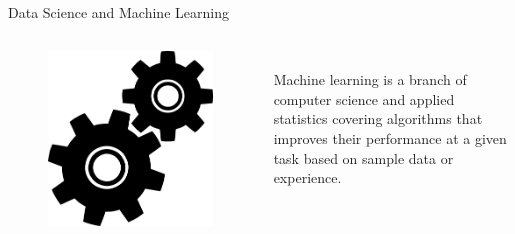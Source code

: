 








\begin{frame}{Data Science and Machine Learning}

\begin{columns}
    \begin{figure}
      \includegraphics[width=\textwidth]{plots/gears.png}
    \end{figure}
  \begingroup
  \centering
    \fontsize{20pt}{22pt}\selectfont
    \vspace{1cm}
    \\
  Machine learning is a branch of computer science and applied statistics covering algorithms that improves their performance at a given task based on sample data or experience.
  \endgroup
\end{columns}

\end{frame}

